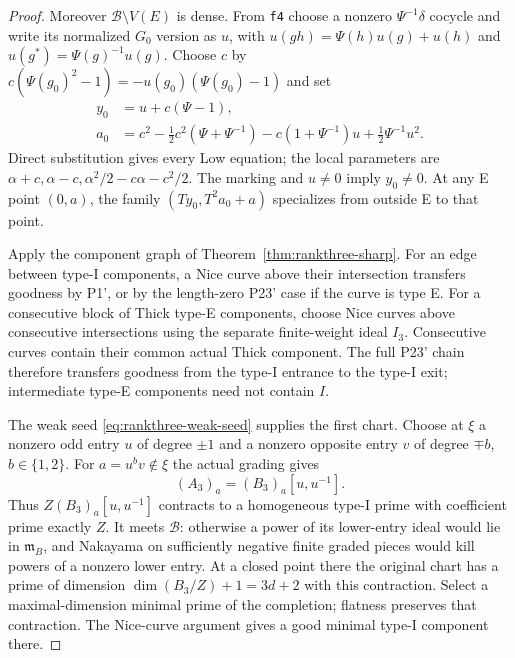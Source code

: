 \begin{proof}
Moreover $\mathcal B\setminus V(E)$ is dense.  From \texttt{f4}
choose a nonzero $\Psi^{-1}\delta$ cocycle and write its normalized
$G_0$ version as $u$, with
$u(gh)=\Psi(h)u(g)+u(h)$ and $u(g^*)=\Psi(g)^{-1}u(g)$.
Choose $c$ by $c(\Psi(g_0)^2-1)=-u(g_0)(\Psi(g_0)-1)$ and set
\begin{align*}
 y_0&=u+c(\Psi-1),\\
 a_0&=c^2-\tfrac12c^2(\Psi+\Psi^{-1})
             -c(1+\Psi^{-1})u+\tfrac12\Psi^{-1}u^2.
\end{align*}
Direct substitution gives every Low equation; the local parameters
are $\alpha+c,\alpha-c,\alpha^2/2-c\alpha-c^2/2$.
The marking and $u\ne0$ imply $y_0\ne0$.  At any E point $(0,a)$,
the family $(Ty_0,T^2a_0+a)$ specializes from outside E to that point.

Apply the component graph of Theorem~\ref{thm:rankthree-sharp}.
For an edge between type-I components, a Nice curve above their
intersection transfers goodness by P1', or by the length-zero P23'
case if the curve is type E.  For a consecutive block of Thick
type-E components, choose Nice curves above consecutive intersections
using the separate finite-weight ideal $I_3$.  Consecutive curves
contain their common actual Thick component.  The full P23' chain
therefore transfers goodness from the type-I entrance to the type-I
exit; intermediate type-E components need not contain $I$.

The weak seed \eqref{eq:rankthree-weak-seed} supplies the first chart.
Choose at $\xi$ a nonzero odd entry $u$ of degree $\pm1$ and a
nonzero opposite entry $v$ of degree $\mp b$, $b\in\{1,2\}$.
For $a=u^bv\notin\xi$ the actual grading gives
\[
                     (A_3)_a=(B_3)_a[u,u^{-1}].
\]
Thus $Z(B_3)_a[u,u^{-1}]$ contracts to a homogeneous type-I prime
with coefficient prime exactly $Z$.  It meets $\mathcal B$:
otherwise a power of its lower-entry ideal would lie in
$\mathfrak m_B$, and Nakayama on sufficiently negative finite
graded pieces would kill powers of a nonzero lower entry.
At a closed point there the original chart has a prime of dimension
$\dim(B_3/Z)+1=3d+2$ with this contraction.  Select a maximal-dimension
minimal prime of the completion; flatness preserves that contraction.
The Nice-curve argument gives a good minimal type-I component there.


\end{proof}

